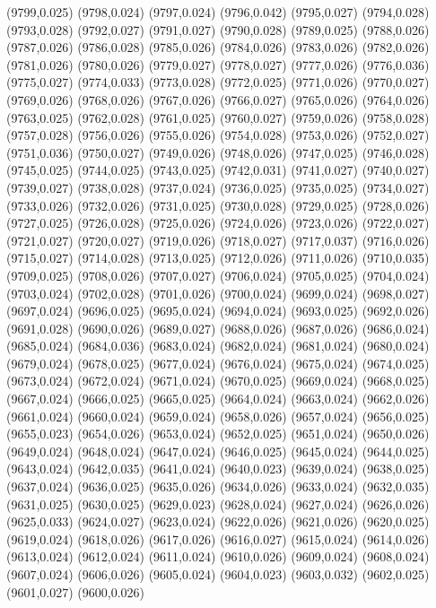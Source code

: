 (9799,0.025)
(9798,0.024)
(9797,0.024)
(9796,0.042)
(9795,0.027)
(9794,0.028)
(9793,0.028)
(9792,0.027)
(9791,0.027)
(9790,0.028)
(9789,0.025)
(9788,0.026)
(9787,0.026)
(9786,0.028)
(9785,0.026)
(9784,0.026)
(9783,0.026)
(9782,0.026)
(9781,0.026)
(9780,0.026)
(9779,0.027)
(9778,0.027)
(9777,0.026)
(9776,0.036)
(9775,0.027)
(9774,0.033)
(9773,0.028)
(9772,0.025)
(9771,0.026)
(9770,0.027)
(9769,0.026)
(9768,0.026)
(9767,0.026)
(9766,0.027)
(9765,0.026)
(9764,0.026)
(9763,0.025)
(9762,0.028)
(9761,0.025)
(9760,0.027)
(9759,0.026)
(9758,0.028)
(9757,0.028)
(9756,0.026)
(9755,0.026)
(9754,0.028)
(9753,0.026)
(9752,0.027)
(9751,0.036)
(9750,0.027)
(9749,0.026)
(9748,0.026)
(9747,0.025)
(9746,0.028)
(9745,0.025)
(9744,0.025)
(9743,0.025)
(9742,0.031)
(9741,0.027)
(9740,0.027)
(9739,0.027)
(9738,0.028)
(9737,0.024)
(9736,0.025)
(9735,0.025)
(9734,0.027)
(9733,0.026)
(9732,0.026)
(9731,0.025)
(9730,0.028)
(9729,0.025)
(9728,0.026)
(9727,0.025)
(9726,0.028)
(9725,0.026)
(9724,0.026)
(9723,0.026)
(9722,0.027)
(9721,0.027)
(9720,0.027)
(9719,0.026)
(9718,0.027)
(9717,0.037)
(9716,0.026)
(9715,0.027)
(9714,0.028)
(9713,0.025)
(9712,0.026)
(9711,0.026)
(9710,0.035)
(9709,0.025)
(9708,0.026)
(9707,0.027)
(9706,0.024)
(9705,0.025)
(9704,0.024)
(9703,0.024)
(9702,0.028)
(9701,0.026)
(9700,0.024)
(9699,0.024)
(9698,0.027)
(9697,0.024)
(9696,0.025)
(9695,0.024)
(9694,0.024)
(9693,0.025)
(9692,0.026)
(9691,0.028)
(9690,0.026)
(9689,0.027)
(9688,0.026)
(9687,0.026)
(9686,0.024)
(9685,0.024)
(9684,0.036)
(9683,0.024)
(9682,0.024)
(9681,0.024)
(9680,0.024)
(9679,0.024)
(9678,0.025)
(9677,0.024)
(9676,0.024)
(9675,0.024)
(9674,0.025)
(9673,0.024)
(9672,0.024)
(9671,0.024)
(9670,0.025)
(9669,0.024)
(9668,0.025)
(9667,0.024)
(9666,0.025)
(9665,0.025)
(9664,0.024)
(9663,0.024)
(9662,0.026)
(9661,0.024)
(9660,0.024)
(9659,0.024)
(9658,0.026)
(9657,0.024)
(9656,0.025)
(9655,0.023)
(9654,0.026)
(9653,0.024)
(9652,0.025)
(9651,0.024)
(9650,0.026)
(9649,0.024)
(9648,0.024)
(9647,0.024)
(9646,0.025)
(9645,0.024)
(9644,0.025)
(9643,0.024)
(9642,0.035)
(9641,0.024)
(9640,0.023)
(9639,0.024)
(9638,0.025)
(9637,0.024)
(9636,0.025)
(9635,0.026)
(9634,0.026)
(9633,0.024)
(9632,0.035)
(9631,0.025)
(9630,0.025)
(9629,0.023)
(9628,0.024)
(9627,0.024)
(9626,0.026)
(9625,0.033)
(9624,0.027)
(9623,0.024)
(9622,0.026)
(9621,0.026)
(9620,0.025)
(9619,0.024)
(9618,0.026)
(9617,0.026)
(9616,0.027)
(9615,0.024)
(9614,0.026)
(9613,0.024)
(9612,0.024)
(9611,0.024)
(9610,0.026)
(9609,0.024)
(9608,0.024)
(9607,0.024)
(9606,0.026)
(9605,0.024)
(9604,0.023)
(9603,0.032)
(9602,0.025)
(9601,0.027)
(9600,0.026)
